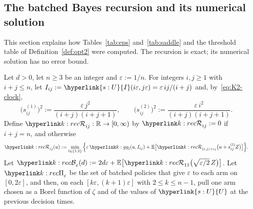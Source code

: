 \documentclass[11pt]{article}
\newcommand{\dt}[1]{\hypertarget{#1}{}}
\DeclareRobustCommand{\sy}[2]{{\hyperlink{#1}{#2}}}
\newcommand{\R}{\mathbb{R}}
\newcommand{\E}{\mathbb{E}}
\newcommand{\1}{\mathbf{1}}
\newcommand{\Ud}{\sy{s:U}{U}}
\newcommand{\Id}{\sy{s:U}{I}}
\begin{document}
\subsection{The batched Bayes recursion and its numerical solution}\label{sec:K2-num}

\medskip
\noindent This section explains how Tables~\ref{tab:eps} and~\ref{tab:saddle} and the threshold table of Definition~\ref{def:opt2} were computed. The recursion
is exact; its numerical solution has no error bound.

\begin{definition}\label{def:K2-rec}\dt{k:rec}
Let $d>0$, let $n\ge3$ be an integer and $\varepsilon:=1/n$. For integers $i,j\ge1$ with $i+j\le n$, let $I_{ij}:=\Id(i\varepsilon,j\varepsilon)=\varepsilon\,ij/(i+j)$ and,
by~\eqref{eq:K2-clock},
\[
\big(s^{(1)}_{ij}\big)^2:=\frac{\varepsilon\,j^2}{(i+j)(i+j+1)},\qquad \big(s^{(2)}_{ij}\big)^2:=\frac{\varepsilon\,i^2}{(i+j)(i+j+1)} .
\]
Define $\kR_{ij}:\R\to[0,\infty)$ by $\kR_{ij}:=0$ if $i+j=n$, and otherwise
\[
\kR_{ij}(u):=\min_{l\in\{1,2\}}\Big\{\varepsilon\,\kg_l(u,I_{ij})+\E\big[\kR_{(i,j)+e_l}\big(u+s^{(l)}_{ij}Z\big)\big]\Big\}.
\]
Let $\kB_\varepsilon(d):=2d\varepsilon+\E\big[\kR_{11}\big(\sqrt{\varepsilon/2}\,Z\big)\big]$. Let $\kPi_\varepsilon$ be the set of batched policies that give $\varepsilon$ to each arm on
$[0,2\varepsilon]$, and then, on each $[k\varepsilon,(k+1)\varepsilon]$ with $2\le k\le n-1$, pull one arm chosen as a Borel function of $\zeta$ and of the values of $\Ud$ at the
previous decision times.
\end{definition}
\end{document}

